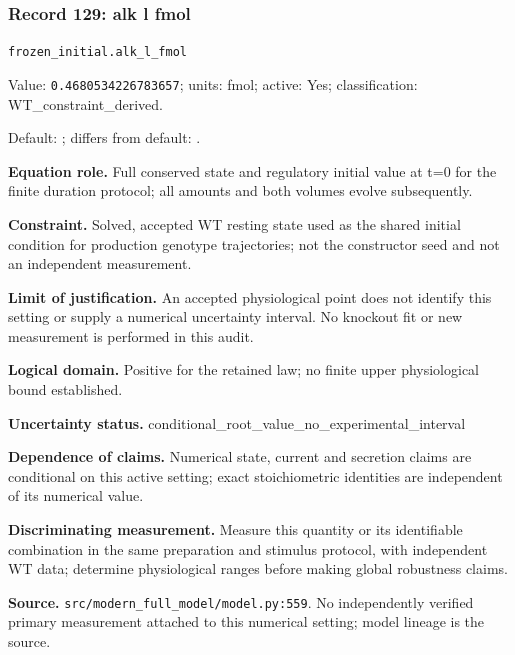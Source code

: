 \subsubsection*{Record 129: alk l fmol}
{\small \nolinkurl{frozen_initial.alk_l_fmol}\par

Value: \texttt{0.4680534226783657}; units: fmol; active: Yes; classification: WT\_constraint\_derived.\par

Default: ; differs from default: .\par

\textbf{Equation role.} Full conserved state and regulatory initial value at t=0 for the finite duration protocol; all amounts and both volumes evolve subsequently.\par

\textbf{Constraint.} Solved, accepted WT resting state used as the shared initial condition for production genotype trajectories; not the constructor seed and not an independent measurement.\par

\textbf{Limit of justification.} An accepted physiological point does not identify this setting or supply a numerical uncertainty interval. No knockout fit or new measurement is performed in this audit.\par

\textbf{Logical domain.} Positive for the retained law; no finite upper physiological bound established.\par

\textbf{Uncertainty status.} conditional\_root\_value\_no\_experimental\_interval\par

\textbf{Dependence of claims.} Numerical state, current and secretion claims are conditional on this active setting; exact stoichiometric identities are independent of its numerical value.\par

\textbf{Discriminating measurement.} Measure this quantity or its identifiable combination in the same preparation and stimulus protocol, with independent WT data; determine physiological ranges before making global robustness claims.\par

\textbf{Source.} \nolinkurl{src/modern_full_model/model.py:559}. No independently verified primary measurement attached to this numerical setting; model lineage is the source.\par}

